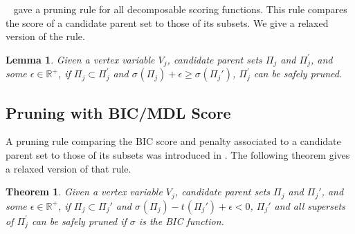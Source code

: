 \documentclass[letterpaper]{article}
\newcommand{\vertex}[1]{V_{#1}}
\newcommand{\score}[2]{\sigma_{#1}({#2})}
\newcommand{\pen}[2]{t_{#1}({#2})}
\newtheorem{theorem}{Theorem}
\newtheorem{lemma}{Lemma}
\begin{document}


\citeauthor{TeyssierK05}~ gave a pruning rule for all decomposable scoring functions. This rule compares the score of a candidate parent set to those of its subsets. We give a relaxed version of the rule.
	

	\begin{lemma}
	Given a vertex variable $\vertex{j}$, candidate parent sets
	$\Pi_j$ and  $\Pi_j^{\prime}$, and some $\epsilon\in \mathbb{R}^+$,  if $\Pi_j \subset \Pi_j^{\prime}$ and $\score{}{\Pi_j} + \epsilon \geq \score{}{\Pi_j'}$,
	$\Pi_j^{\prime}$ can be safely pruned. \label{lem:scoreprune}
	\end{lemma}
	
\subsection{Pruning with BIC/MDL Score}


A pruning rule comparing the BIC score and penalty associated to a candidate parent set to those of its subsets was introduced in \cite{CamposJ11}. The following theorem gives a relaxed version of that rule.
\begin{theorem}
Given a vertex variable $\vertex{j}$,  candidate parent sets
	$\Pi_j$ and $\Pi_j'$, and some $\epsilon \in \mathbb{R}^+$,
	if $\Pi_j \subset \Pi_j'$ and $\score{}{\Pi_j} -  \pen{}{\Pi_j'} + \epsilon < 0$,
	$\Pi_j'$ and all supersets of $\Pi_j^{\prime}$ can be safely pruned  if $\sigma$ is the BIC function.
\end{theorem}
\end{document}
